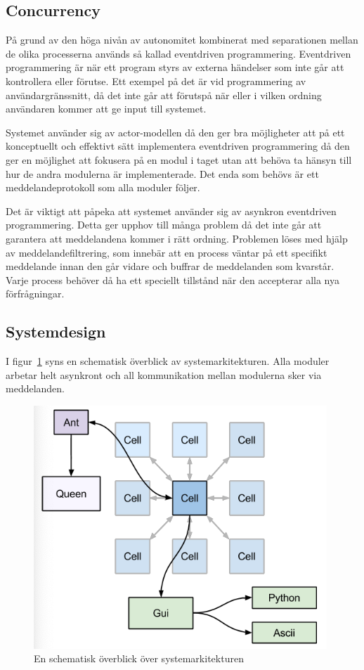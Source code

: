 \documentclass[12pt]{article}
\begin{document}
\subsection{Concurrency}
På grund av den höga nivån av autonomitet kombinerat med separationen mellan de olika processerna används så kallad eventdriven programmering.
Eventdriven programmering är när ett program styrs av externa händelser som inte går att kontrollera eller förutse.
Ett exempel på det är vid programmering av användargränssnitt,
då det inte går att förutspå när eller i vilken ordning användaren kommer att ge input till systemet.

Systemet använder sig av actor-modellen då den ger bra möjligheter att på ett konceptuellt och effektivt sätt implementera eventdriven programmering då den ger en möjlighet att fokusera på en modul i taget utan att behöva ta hänsyn till hur de andra modulerna är implementerade.
Det enda som behövs är ett meddelandeprotokoll som alla moduler följer.

Det är viktigt att påpeka att systemet använder sig av asynkron eventdriven programmering.
Detta ger upphov till många problem då det inte går att garantera att meddelandena kommer i rätt ordning.
Problemen löses med hjälp av meddelandefiltrering,
som innebär att en process väntar på ett specifikt meddelande innan den går vidare och buffrar de meddelanden som kvarstår.
Varje process behöver då ha ett speciellt tillstånd när den accepterar alla nya förfrågningar.

\subsection{Systemdesign}
I figur~\ref{fig:sysark-overview} syns en schematisk överblick av systemarkitekturen.
Alla moduler arbetar helt asynkront och all kommunikation mellan modulerna sker via meddelanden.

\begin{figure}[H]
    \centering
    \includegraphics[width=\textwidth]{BugsLife-Fig2.png}
    \caption{En schematisk överblick över systemarkitekturen}\label{fig:sysark-overview}
\end{figure}
\end{document}

